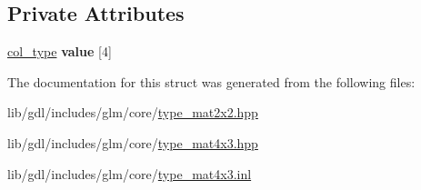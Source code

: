 \subsection*{Private Attributes}
\begin{DoxyCompactItemize}
\item 
\hypertarget{structglm_1_1detail_1_1tmat4x3_ad477829c0a1fb10ee05ba34f71fc0048}{}\hyperlink{structglm_1_1detail_1_1tvec3}{col\+\_\+type} {\bfseries value} \mbox{[}4\mbox{]}\label{structglm_1_1detail_1_1tmat4x3_ad477829c0a1fb10ee05ba34f71fc0048}

\end{DoxyCompactItemize}


The documentation for this struct was generated from the following files\+:\begin{DoxyCompactItemize}
\item 
lib/gdl/includes/glm/core/\hyperlink{type__mat2x2_8hpp}{type\+\_\+mat2x2.\+hpp}\item 
lib/gdl/includes/glm/core/\hyperlink{type__mat4x3_8hpp}{type\+\_\+mat4x3.\+hpp}\item 
lib/gdl/includes/glm/core/\hyperlink{type__mat4x3_8inl}{type\+\_\+mat4x3.\+inl}\end{DoxyCompactItemize}
